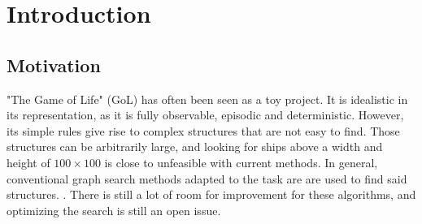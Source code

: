 \documentclass{l4proj}
\begin{document}
\tableofcontents

%
%
%
%
%
%
%
%
\chapter{Introduction}


\section{Motivation}

"The Game of Life" (GoL) has often been seen as a toy project. It is idealistic in its representation, as it is fully observable, episodic and deterministic. However, its simple rules give rise to complex structures that are not easy to find. Those structures can be arbitrarily large, and looking for ships above a width and height of $100 \times 100$ is close to unfeasible with current methods. In general, conventional graph search methods adapted to the task are are used to find said structures. \citep{list_of_search_algorithms}. There is still a lot of room for improvement for these algorithms, and optimizing the search is still an open issue.
\end{document}

